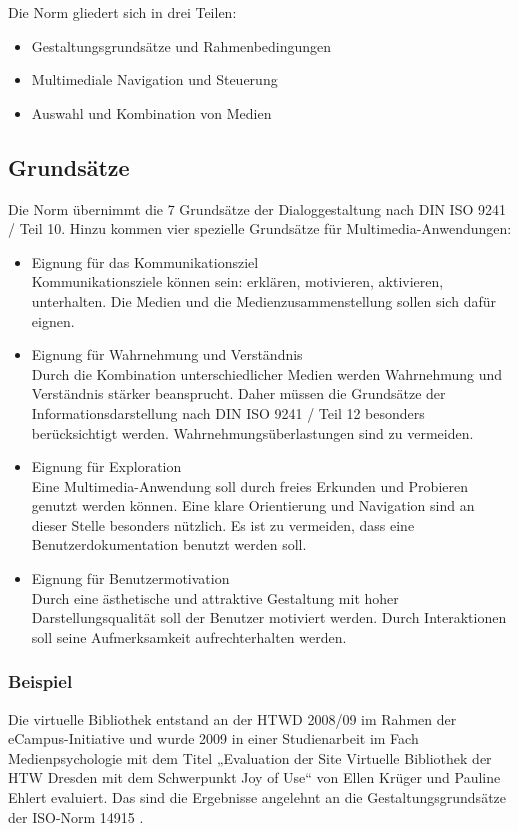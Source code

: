 Die Norm gliedert sich in drei Teilen:
\begin{itemize}
\item Gestaltungsgrundsätze und Rahmenbedingungen
\item Multimediale Navigation und Steuerung
\item Auswahl und Kombination von Medien
\end{itemize}
\subsection{Grundsätze}
Die Norm übernimmt die 7 Grundsätze der Dialoggestaltung nach DIN ISO 9241 / Teil 10. Hinzu kommen vier spezielle Grundsätze für Multimedia-Anwendungen:

\begin{itemize}
\item Eignung für das Kommunikationsziel\\
Kommunikationsziele können sein: erklären, motivieren, aktivieren, unterhalten. Die Medien und die Medienzusammenstellung sollen sich dafür eignen. 
\item Eignung für Wahrnehmung und Verständnis\\
Durch die Kombination unterschiedlicher Medien werden Wahrnehmung und Verständnis stärker beansprucht. Daher müssen die Grundsätze der Informationsdarstellung nach DIN ISO 9241 / Teil 12 besonders berücksichtigt werden. Wahrnehmungsüberlastungen sind zu vermeiden. 
\item Eignung für Exploration\\
Eine Multimedia-Anwendung soll durch freies Erkunden und Probieren genutzt werden können. Eine klare Orientierung und Navigation sind an dieser Stelle besonders nützlich. Es ist zu vermeiden, dass eine Benutzerdokumentation benutzt werden soll.  
\item Eignung für Benutzermotivation\\
Durch eine ästhetische und attraktive Gestaltung mit hoher Darstellungsqualität soll der Benutzer motiviert werden. Durch Interaktionen soll seine Aufmerksamkeit aufrechterhalten werden.
\end{itemize}

\subsubsection*{Beispiel}
Die virtuelle Bibliothek entstand an der HTWD 2008/09 im Rahmen der eCampus-Initiative und wurde 2009 in einer Studienarbeit im Fach Medienpsychologie mit dem Titel „Evaluation der Site Virtuelle Bibliothek der HTW Dresden mit dem Schwerpunkt Joy of Use“ von Ellen Krüger und Pauline Ehlert evaluiert. Das sind die Ergebnisse angelehnt an die Gestaltungsgrundsätze der ISO-Norm 14915 .\bigskip

